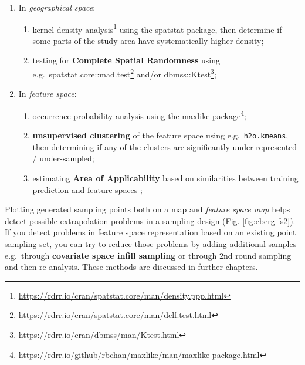 \documentclass[
  graybox,natbib,nospthms]{svmono}
\providecommand{\tightlist}{%
  \setlength{\itemsep}{0pt}\setlength{\parskip}{0pt}}
\providecommand{\tightlist}{\setlength{\itemsep}{0pt}\setlength{\parskip}{0pt}}
\renewcommand{\href}[2]{#2 (\url{#1})}
\renewcommand{\href}[2]{#2\footnote{\url{#1}}}
\begin{document}
\begin{enumerate}
\def\labelenumi{\arabic{enumi}.}
\tightlist
\item
  In \emph{geographical space}:

  \begin{enumerate}
  \def\labelenumii{(\alph{enumii})}
  \tightlist
  \item
    \href{https://rdrr.io/cran/spatstat.core/man/density.ppp.html}{kernel density analysis} using the spatstat package, then determine if some parts of the study area have systematically higher density;\\
  \item
    testing for \textbf{Complete Spatial Randomness} \citep{schabenberger2005statistical} using e.g.~\href{https://rdrr.io/cran/spatstat.core/man/dclf.test.html}{spatstat.core::mad.test} and/or \href{https://rdrr.io/cran/dbmss/man/Ktest.html}{dbmss::Ktest};\\
  \end{enumerate}
\item
  In \emph{feature space}:

  \begin{enumerate}
  \def\labelenumii{(\alph{enumii})}
  \tightlist
  \item
    occurrence probability analysis using the \href{https://rdrr.io/github/rbchan/maxlike/man/maxlike-package.html}{maxlike package};
  \item
    \textbf{unsupervised clustering} of the feature space using e.g.~\texttt{h2o.kmeans}, then determining if
    any of the clusters are significantly under-represented / under-sampled;\\
  \item
    estimating \textbf{Area of Applicability} based on similarities between training
    prediction and feature spaces \citep{meyer2021predicting};
  \end{enumerate}
\end{enumerate}

Plotting generated sampling points both on a map and \emph{feature space map} helps
detect possible extrapolation problems in a sampling design (Fig. \ref{fig:eberg-fs2}).
If you detect problems in feature space representation based on an existing point
sampling set, you can try to reduce those problems by adding additional samples e.g.~through
\textbf{covariate space infill sampling} \citep{Brus2021sampling} or through 2nd round
sampling and then re-analysis. These methods are discussed in further chapters.
\end{document}
